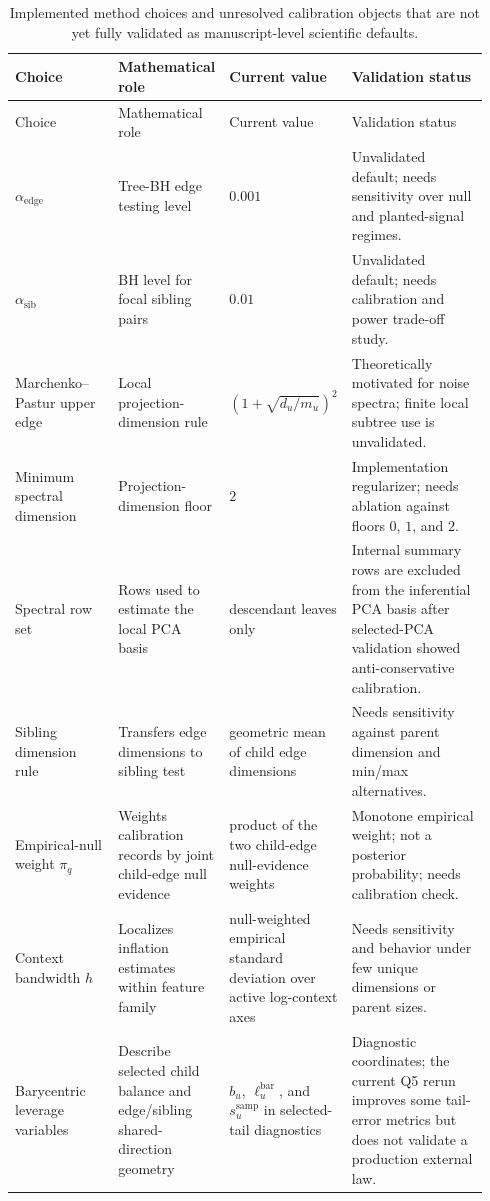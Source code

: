 \begingroup
\footnotesize
\setlength{\tabcolsep}{4pt}
\begin{longtable}{@{}>{\raggedright\arraybackslash}p{0.23\linewidth}>{\raggedright\arraybackslash}p{0.21\linewidth}>{\raggedright\arraybackslash}p{0.19\linewidth}>{\raggedright\arraybackslash}p{0.31\linewidth}@{}}
\caption{Implemented method choices and unresolved calibration objects that are
not yet fully validated as manuscript-level scientific defaults.}
\label{tab:method-constants}\\
\toprule
Choice & Mathematical role & Current value & Validation status \\
\midrule
\endfirsthead
\toprule
Choice & Mathematical role & Current value & Validation status \\
\midrule
\endhead
$\alpha_{\mathrm{edge}}$ & Tree-BH edge testing level & $0.001$ & Unvalidated default; needs sensitivity over null and planted-signal regimes. \\
$\alpha_{\mathrm{sib}}$ & BH level for focal sibling pairs & $0.01$ & Unvalidated default; needs calibration and power trade-off study. \\
Marchenko--Pastur upper edge & Local projection-dimension rule & $(1+\sqrt{d_u/m_u})^2$ & Theoretically motivated for noise spectra; finite local subtree use is unvalidated. \\
Minimum spectral dimension & Projection-dimension floor & $2$ & Implementation regularizer; needs ablation against floors $0$, $1$, and $2$. \\
Spectral row set & Rows used to estimate the local PCA basis & descendant leaves only & Internal summary rows are excluded from the inferential PCA basis after selected-PCA validation showed anti-conservative calibration. \\
Sibling dimension rule & Transfers edge dimensions to sibling test & geometric mean of child edge dimensions & Needs sensitivity against parent dimension and min/max alternatives. \\
Empirical-null weight $\pi_q$ & Weights calibration records by joint child-edge null evidence & product of the two child-edge null-evidence weights & Monotone empirical weight; not a posterior probability; needs calibration check. \\
Context bandwidth $h$ & Localizes inflation estimates within feature family & null-weighted empirical standard deviation over active log-context axes & Needs sensitivity and behavior under few unique dimensions or parent sizes. \\
Barycentric leverage variables & Describe selected child balance and edge/sibling shared-direction geometry & $b_u$, $\ell_u^{\mathrm{bar}}$, and $s_u^{\mathrm{samp}}$ in selected-tail diagnostics & Diagnostic coordinates; the current Q5 rerun improves some tail-error metrics but does not validate a production external law. \\

\end{longtable}
